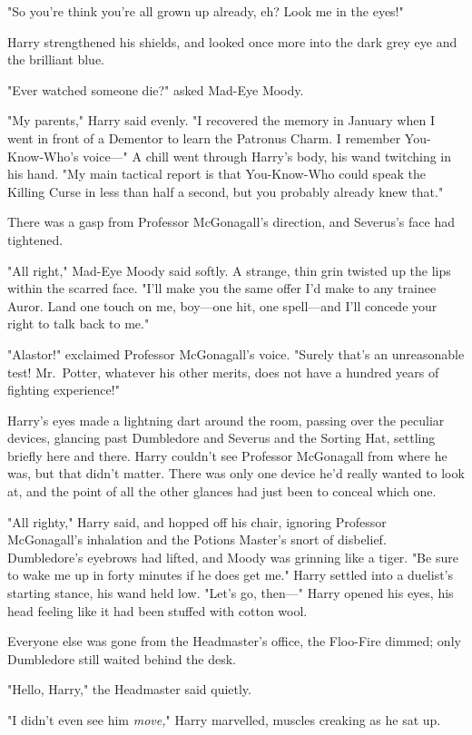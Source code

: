 "So you're think you're all grown up already, eh? Look me in the eyes!"

Harry strengthened his shields, and looked once more into the dark grey eye and
the brilliant blue.

"Ever watched someone die?" asked Mad-Eye Moody.

"My parents," Harry said evenly. "I recovered the memory in January when I went
in front of a Dementor to learn the Patronus Charm. I remember You-Know-Who's
voice---" A chill went through Harry's body, his wand twitching in his hand.
"My main tactical report is that You-Know-Who could speak the Killing Curse in
less than half a second, but you probably already knew that."

There was a gasp from Professor McGonagall's direction, and Severus's face had
tightened.

"All right," Mad-Eye Moody said softly. A strange, thin grin twisted up the
lips within the scarred face. "I'll make you the same offer I'd make to any
trainee Auror. Land one touch on me, boy---one hit, one spell---and I'll
concede your right to talk back to me."

"Alastor!" exclaimed Professor McGonagall's voice. "Surely that's an
unreasonable test! Mr.~Potter, whatever his other merits, does not have a
hundred years of fighting experience!"

Harry's eyes made a lightning dart around the room, passing over the peculiar
devices, glancing past Dumbledore and Severus and the Sorting Hat, settling
briefly here and there. Harry couldn't see Professor McGonagall from where he
was, but that didn't matter. There was only one device he'd really wanted to
look at, and the point of all the other glances had just been to conceal which
one.

"All righty," Harry said, and hopped off his chair, ignoring Professor
McGonagall's inhalation and the Potions Master's snort of disbelief.
Dumbledore's eyebrows had lifted, and Moody was grinning like a tiger. "Be sure
to wake me up in forty minutes if he does get me." Harry settled into a
duelist's starting stance, his wand held low. "Let's go, then---"
\later
Harry opened his eyes, his head feeling like it had been stuffed with cotton
wool.

Everyone else was gone from the Headmaster's office, the Floo-Fire dimmed; only
Dumbledore still waited behind the desk.

"Hello, Harry," the Headmaster said quietly.

"I didn't even see him \emph{move,}" Harry marvelled, muscles creaking as he
sat up.

